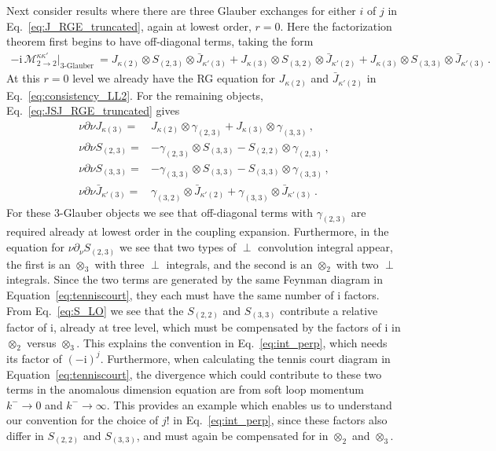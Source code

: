 \documentclass[letterpaper,11pt]{article}
\newcommand{\eq}[1]{Eq.~\eqref{eq:#1}}
\newcommand{\img}{\mathrm{i}}
\newcommand{\cM}{\mathcal{M}}
\newcommand{\nn}{\nonumber}
\newcommand{\Eq}[1]{Equation~\eqref{#1}}
\DeclareRobustCommand{\Eq}[1]{Eq.~(\ref{#1})}
\begin{document}
Next consider results where there are three Glauber exchanges for either $i$ of $j$ in \eq{J_RGE_truncated}, again at lowest order, $r=0$. Here the factorization theorem first begins to have off-diagonal terms, taking the form
\begin{align}
- \img\,\cM_{2\to 2}^{\kappa\kappa'} \Big|_{\text{3-Glauber}} 
  &=  J_{\kappa(2)} \otimes S_{(2,3)} \otimes \bar J_{\kappa'(3)}
   +  J_{\kappa(3)} \otimes S_{(3,2)} \otimes \bar J_{\kappa'(2)}
   +  J_{\kappa(3)} \otimes S_{(3,3)} \otimes \bar J_{\kappa'(3)}
  \,.
\end{align}
At this $r=0$ level we already have the RG equation for $J_{\kappa(2)}$ and $\bar J_{\kappa'(2)}$ in \eq{consistency_LL2}. For the remaining objects,
\eq{JSJ_RGE_truncated} gives
\begin{align}\label{eq:consistency_LL3}
  \nu\partial\nu J_{\kappa(3)}=
   &  J_{\kappa(2)} \otimes \gamma_{(2,3)}
   +  J_{\kappa(3)} \otimes \gamma_{(3,3)} 
  \,, \\
  \nu\partial\nu S_{(2,3)}=
   & - \gamma_{(2,3)}\otimes S_{(3,3)} 
     - S_{(2,2)}\otimes \gamma_{(2,3)}
  \,, \nn \\
\nu\partial\nu S_{(3,3)}=& -\gamma_{(3,3)}\otimes S_{(3,3)} - S_{(3,3)}\otimes \gamma_{(3,3)}
  \,, \nn \\
  \nu\partial\nu \bar J_{\kappa'(3)}=&  \gamma_{(3,2)} \otimes \bar J_{\kappa'(2)} + \gamma_{(3,3)} \otimes \bar J_{\kappa'(3)}
  \,. \nn
\end{align}
For these 3-Glauber objects we see that off-diagonal terms with $\gamma_{(2,3)}$ are required already at lowest order in the coupling expansion.  Furthermore, in the equation for $\nu\partial_\nu S_{(2,3)}$ we see that two types of $\perp$ convolution integral appear, the first is an $\otimes_3$ with three $\perp$ integrals, and the second is an $\otimes_2$ with two $\perp$ integrals.  Since the two terms are generated by the same Feynman diagram in \Eq{eq:tenniscourt}, they each must have the same number of $\img$ factors. From \eq{S_LO} we see that  the $S_{(2,2)}$ and $S_{(3,3)}$ contribute a relative factor of $\img$, already at tree level, which must be compensated by the factors of $\img$ in $\otimes_2$ versus $\otimes_3$.  This explains the convention in \eq{int_perp}, which needs its factor of $(-\img)^j$.  
%
Furthermore, when calculating the tennis court diagram in \Eq{eq:tenniscourt}, the divergence which could contribute to these two terms in the anomalous dimension equation are from soft loop momentum $k^-\to 0$ and $k^-\to \infty$. This provides an example which enables us to understand our convention for the choice of $j!$ in \eq{int_perp}, since these factors also differ in $S_{(2,2)}$ and $S_{(3,3)}$, and must again be compensated for in $\otimes_2$ and $\otimes_3$.
\end{document}
